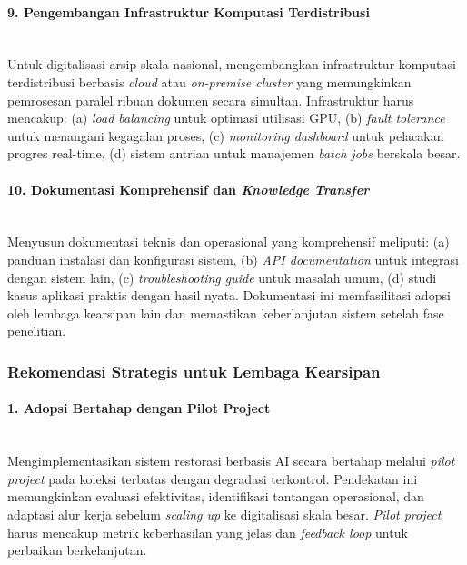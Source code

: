 \documentclass[12pt,a4paper]{article}
\begin{document}
\paragraph{9. Pengembangan Infrastruktur Komputasi Terdistribusi} \mbox{}\\[0.1em]
Untuk digitalisasi arsip skala nasional, mengembangkan infrastruktur komputasi terdistribusi berbasis \textit{cloud} atau \textit{on-premise cluster} yang memungkinkan pemrosesan paralel ribuan dokumen secara simultan. Infrastruktur harus mencakup: (a) \textit{load balancing} untuk optimasi utilisasi GPU, (b) \textit{fault tolerance} untuk menangani kegagalan proses, (c) \textit{monitoring dashboard} untuk pelacakan progres real-time, (d) sistem antrian untuk manajemen \textit{batch jobs} berskala besar.

\paragraph{10. Dokumentasi Komprehensif dan \textit{Knowledge Transfer}} \mbox{}\\[0.1em]
Menyusun dokumentasi teknis dan operasional yang komprehensif meliputi: (a) panduan instalasi dan konfigurasi sistem, (b) \textit{API documentation} untuk integrasi dengan sistem lain, (c) \textit{troubleshooting guide} untuk masalah umum, (d) studi kasus aplikasi praktis dengan hasil nyata. Dokumentasi ini memfasilitasi adopsi oleh lembaga kearsipan lain dan memastikan keberlanjutan sistem setelah fase penelitian.

\vspace{0.8em}

\subsubsection{Rekomendasi Strategis untuk Lembaga Kearsipan}
\label{subsubsec:rekomendasi-lembaga}

\paragraph{1. Adopsi Bertahap dengan Pilot Project} \mbox{}\\[0.1em]
Mengimplementasikan sistem restorasi berbasis AI secara bertahap melalui \textit{pilot project} pada koleksi terbatas dengan degradasi terkontrol. Pendekatan ini memungkinkan evaluasi efektivitas, identifikasi tantangan operasional, dan adaptasi alur kerja sebelum \textit{scaling up} ke digitalisasi skala besar. \textit{Pilot project} harus mencakup metrik keberhasilan yang jelas dan \textit{feedback loop} untuk perbaikan berkelanjutan.
\end{document}
